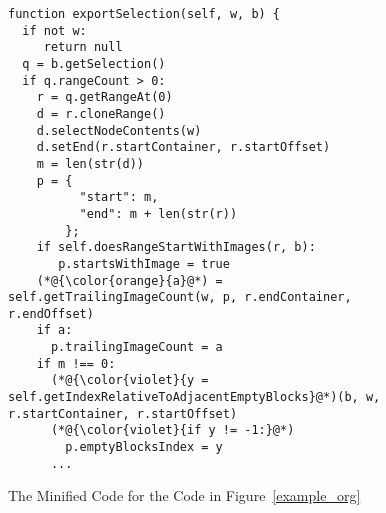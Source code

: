 \begin{figure}[t]
	\centering
	\begin{lstlisting}[]
function exportSelection(self, w, b) {
  if not w:
     return null
  q = b.getSelection()
  if q.rangeCount > 0:
    r = q.getRangeAt(0)
    d = r.cloneRange()
    d.selectNodeContents(w)
    d.setEnd(r.startContainer, r.startOffset)
    m = len(str(d))
    p = {
          "start": m,
          "end": m + len(str(r))
        };
    if self.doesRangeStartWithImages(r, b):
       p.startsWithImage = true
    (*@{\color{orange}{a}@*) = self.getTrailingImageCount(w, p, r.endContainer, r.endOffset)
    if a:
      p.trailingImageCount = a
    if m !== 0:
      (*@{\color{violet}{y = self.getIndexRelativeToAdjacentEmptyBlocks}@*)(b, w, r.startContainer, r.startOffset)
      (*@{\color{violet}{if y != -1:}@*)
        p.emptyBlocksIndex = y
      ...
\end{lstlisting}
\vspace{-12pt}
\caption{The Minified Code for the Code in Figure~\ref{example_org}}
\label{example_sim}
\end{figure}
